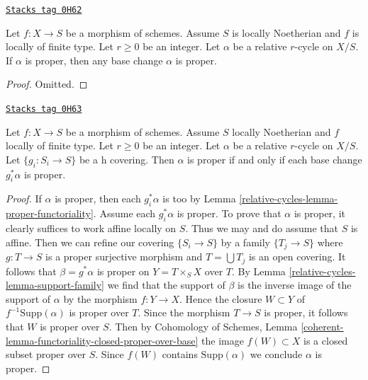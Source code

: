 \begin{lemma}
\label{relative-cycles-lemma-proper-functoriality}
\href{https://stacks.math.columbia.edu/tag/0H62}{\texttt{Stacks tag 0H62}}

Let $f : X \to S$ be a morphism of schemes. Assume $S$ is locally Noetherian
and $f$ is locally of finite type. Let $r \geq 0$ be an integer. Let
$\alpha$ be a relative $r$-cycle on $X/S$. If $\alpha$ is proper,
then any base change $\alpha$ is proper.
\end{lemma}

\begin{proof}
Omitted.
\end{proof}

\begin{lemma}
\label{relative-cycles-lemma-proper-h-descent}
\href{https://stacks.math.columbia.edu/tag/0H63}{\texttt{Stacks tag 0H63}}

Let $f : X \to S$ be a morphism of schemes. Assume $S$ locally Noetherian
and $f$ locally of finite type. Let $r \geq 0$ be an integer. Let $\alpha$
be a relative $r$-cycle on $X/S$. Let $\{g_i : S_i \to S\}$
be a h covering. Then $\alpha$ is proper
if and only if each base change $g_i^*\alpha$ is proper.
\end{lemma}

\begin{proof}
If $\alpha$ is proper, then each $g_i^*\alpha$ is too by
Lemma \ref{relative-cycles-lemma-proper-functoriality}. Assume each $g_i^*\alpha$
is proper. To prove that $\alpha$ is proper, it clearly suffices
to work affine locally on $S$. Thus we may and do assume that $S$
is affine. Then we can refine our covering $\{S_i \to S\}$
by a family $\{T_j \to S\}$ where $g : T \to S$ is a proper surjective
morphism and $T = \bigcup T_j$ is an open covering.
It follows that $\beta = g^*\alpha$ is proper on $Y = T \times_S X$
over $T$. By Lemma \ref{relative-cycles-lemma-support-family} we find that the support
of $\beta$ is the inverse image of the support of $\alpha$ by the
morphism $f : Y \to X$. Hence the closure $W \subset Y$
of $f^{-1}\text{Supp}(\alpha)$ is proper over $T$. Since the
morphism $T \to S$ is proper, it follows that $W$ is proper over $S$.
Then by Cohomology of Schemes, Lemma
\ref{coherent-lemma-functoriality-closed-proper-over-base}
the image $f(W) \subset X$ is a closed subset proper over $S$.
Since $f(W)$ contains $\text{Supp}(\alpha)$ we conclude $\alpha$
is proper.
\end{proof}


